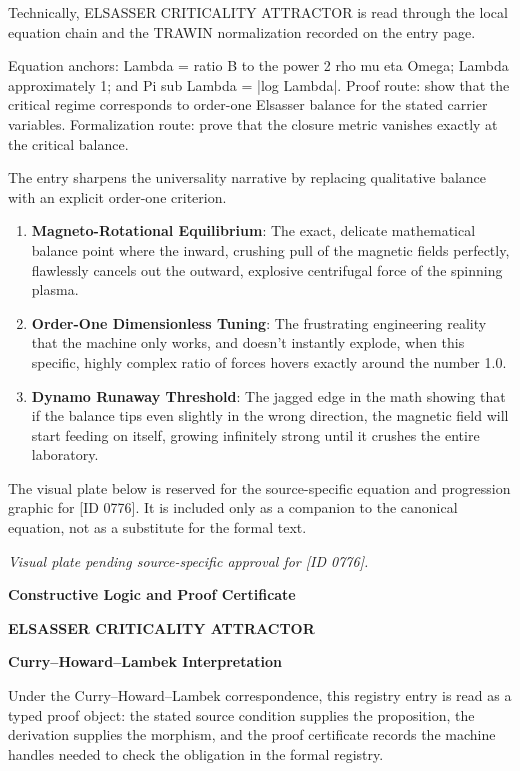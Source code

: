 Technically, ELSASSER CRITICALITY ATTRACTOR is read through the local equation chain and the TRAWIN normalization recorded on the entry page.

Equation anchors: Lambda = ratio B to the power 2 rho mu eta Omega; Lambda approximately 1; and Pi sub Lambda = |log Lambda|. Proof route: show that the critical regime corresponds to order-one Elsasser balance for the stated carrier variables. Formalization route: prove that the closure metric vanishes exactly at the critical balance.

The entry sharpens the universality narrative by replacing qualitative balance with an explicit order-one criterion.
\endgroup

\begin{enumerate}[leftmargin=1.6em,itemsep=6pt,topsep=4pt]
\item \textbf{Magneto-Rotational Equilibrium}: The exact, delicate mathematical balance point where the inward, crushing pull of the magnetic fields perfectly, flawlessly cancels out the outward, explosive centrifugal force of the spinning plasma.
\item \textbf{Order-One Dimensionless Tuning}: The frustrating engineering reality that the machine only works, and doesn't instantly explode, when this specific, highly complex ratio of forces hovers exactly around the number 1.0.
\item \textbf{Dynamo Runaway Threshold}: The jagged edge in the math showing that if the balance tips even slightly in the wrong direction, the magnetic field will start feeding on itself, growing infinitely strong until it crushes the entire laboratory.
\end{enumerate}

\begingroup\footnotesize\sloppy
The visual plate below is reserved for the source-specific equation and progression graphic for [ID 0776]. It is included only as a companion to the canonical equation, not as a substitute for the formal text.
\par\endgroup
\begingroup\footnotesize\itshape
Visual plate pending source-specific approval for [ID 0776].
\par\endgroup

\clearpage
\begingroup\tzpsupportsetup
\noindent\textbf{\fontsize{10.8pt}{12.8pt}\selectfont [ID 0776] Constructive Logic and Proof Certificate}\par
\noindent\textbf{\fontsize{10pt}{12pt}\selectfont ELSASSER CRITICALITY ATTRACTOR}\par
\vspace{0.45em}
\begingroup
\footnotesize
\setlength{\parskip}{0.22em}
\setlength{\parindent}{0pt}
\noindent\textbf{Curry--Howard--Lambek Interpretation}\par
Under the Curry--Howard--Lambek correspondence, this registry entry is read as a typed proof
object: the stated source condition supplies the proposition, the derivation supplies the
morphism, and the proof certificate records the machine handles needed to check the obligation
in the formal registry.

